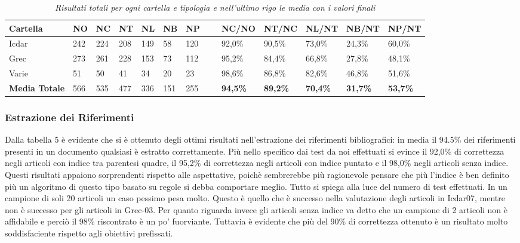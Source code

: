 		\begin{table}\label{tab:totale}
	\begin{center}
	\begin{tabular}{|l|l|l|l|l|l|l|l|l|l|l|l|l|} \hline
	Cartella & NO & NC & NT & NL & NB & NP & ~ & NC/NO & NT/NC & NL/NT & NB/NT & NP/NT \\ \hline
	Icdar & 242 & 224 & 208 & 149 & 58 & 120 & ~ & 92,0\% & 90,5\% & 73,0\% & 24,3\% & 60,0\%\\ 
	Grec & 273 & 261 & 228 & 153 & 73 & 112 & ~ & 95,2\% & 84,4\% & 66,8\% & 27,8\% & 48,1\%\\
	Varie & 51 & 50 & 41 & 34 & 20 & 23 & ~ & 98,6\% & 86,8\% & 82,6\% & 46,8\% & 51,6\%\\ \hline
	\textbf{Media Totale} & 566 &	535	 & 477 &	336 &	151 & 	255 & ~ & \textbf{94,5\%} & \textbf{89,2\%} &	\textbf{70,4\%} & \textbf{31,7\%} & \textbf{53,7\%} \\ \hline

	\end{tabular}
	\tiny{\caption{\textit{Risultati totali per ogni cartella e tipologia e nell'ultimo rigo le media con i valori finali}}}
	\end{center}
	\end{table}
	



\subsubsection{Estrazione dei Riferimenti}
Dalla tabella 5 è evidente che si è ottenuto degli ottimi risultati nell'estrazione dei riferimenti bibliografici: in media il 94.5\% dei riferimenti presenti in un documento qualsiasi è estratto correttamente. Più nello specifico dai test da noi effettuati si evince il 92,0\% di correttezza negli articoli con indice tra parentesi quadre, il 95,2\% di correttezza negli articoli con indice puntato e il 98,0\% negli articoli senza indice. Questi risultati appaiono sorprendenti rispetto alle aspettative, poichè sembrerebbe più ragionevole pensare che più l'indice è ben definito più un algoritmo di questo tipo basato su regole si debba comportare meglio. Tutto si spiega alla luce del numero di test effettuati. In un campione di soli 20 articoli un caso pessimo pesa molto. Questo è quello che è successo nella valutazione degli articoli in Icdar07, mentre non è successo per gli articoli in Grec-03. Per quanto riguarda invece gli articoli senza indice va detto che un campione di 2 articoli non è affidabile e perciò il 98\% riscontrato è un po' fuorviante. Tuttavia è evidente che più del 90\% di correttezza ottenuto è un risultato molto soddisfaciente rispetto agli obiettivi prefissati. 

